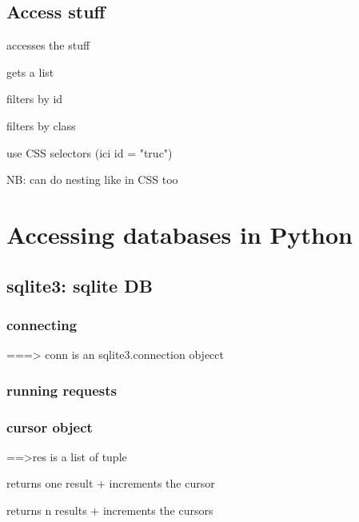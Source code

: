 	\subsection{Access stuff}

		 accesses the stuff

		 gets a list

		 filters by id

		 filters by class

		 use CSS selectors (ici id = "truc")

		NB: can do nesting like in CSS too



\section{Accessing databases in Python}

	\subsection{sqlite3: sqlite DB}

	\subsubsection{connecting}


		 ===> conn is an sqlite3.connection objecct

	\subsubsection{running requests}

		\subsubsection{cursor object}


			 ==>res is a list of tuple

			 returns one result + increments the cursor

			 returns n results + increments the cursors

